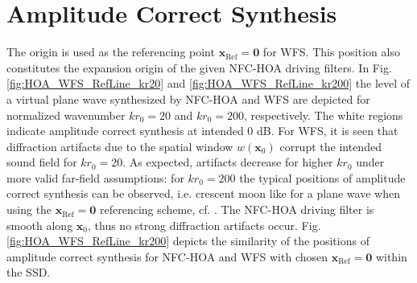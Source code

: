 \documentclass[a4paper, 10pt, twocolumn]{article}
\begin{document}
\section*{Amplitude Correct Synthesis}
\label{sec:ACS}
\noindent\hspace*{2mm} The origin is used as the referencing point $\mathbf{x}_\text{Ref}=\mathbf{0}$
for WFS.
This position also constitutes the expansion origin of the given NFC-HOA driving filters.
In Fig. \ref{fig:HOA_WFS_RefLine_kr20} and \ref{fig:HOA_WFS_RefLine_kr200} the
level of a virtual plane wave synthesized by NFC-HOA and WFS are depicted
for normalized wavenumber $k r_0=20$ and $k r_0=200$, respectively.
The white regions indicate amplitude correct synthesis at intended 0 dB.
For WFS, it is seen that diffraction artifacts due to the spatial window $w(\mathbf{x}_0)$
corrupt the intended sound field for
$k r_0 = 20$.
As expected, artifacts decrease for higher $k r_0$ under more valid far-field assumptions:
for $k r_0=200$ the typical positions of amplitude correct synthesis can be observed, i.e.
crescent moon like for a plane wave when using the $\mathbf{x}_\text{Ref}=\mathbf{0}$ 
referencing scheme, cf. \cite[Fig. 8]{FirthaIEEE2017}.
%
The NFC-HOA driving filter is smooth along $\mathbf{x}_0$, thus no strong diffraction
artifacts occur.
Fig. \ref{fig:HOA_WFS_RefLine_kr200} depicts the similarity of the positions of 
amplitude correct synthesis for NFC-HOA and WFS with chosen $\mathbf{x}_\text{Ref}=\mathbf{0}$
within the SSD.
\end{document}
